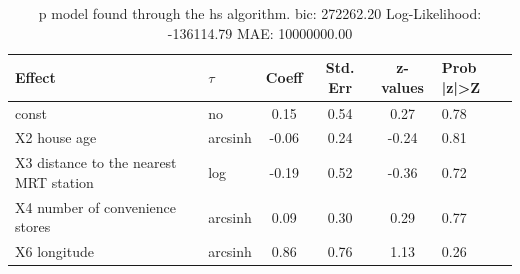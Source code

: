 \begin{table}
	\caption{p model found through the hs algorithm. bic: 272262.20 Log-Likelihood: -136114.79 MAE: 10000000.00}
	\begin{center}
		\begin{tabular}{|l|l|c|c|c|l|}
			\hline
			Effect & $\tau$ & Coeff & Std. Err & z-values & Prob |z|>Z \\
			\hline
			const & no & 0.15 & 0.54 & 0.27 & 0.78 \\
			\hline
			X2 house age & arcsinh & -0.06 & 0.24 & -0.24 & 0.81 \\
			\hline
			X3 distance to the nearest MRT station & log & -0.19 & 0.52 & -0.36 & 0.72 \\
			\hline
			X4 number of convenience stores & arcsinh & 0.09 & 0.30 & 0.29 & 0.77 \\
			\hline
			X6 longitude & arcsinh & 0.86 & 0.76 & 1.13 & 0.26 \\
			\hline
		\end{tabular}
	\end{center}
\end{table}